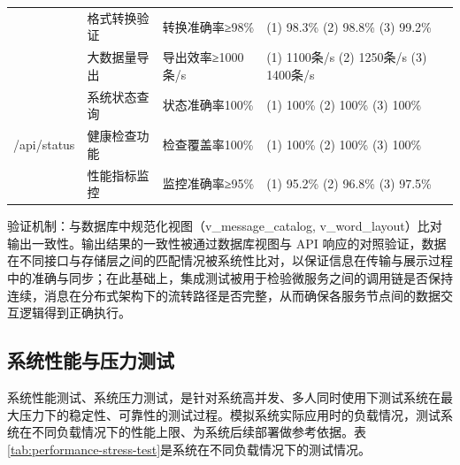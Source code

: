 \begin{table}[H]
{\begin{tabular}{l|l|l|l}
\cline{2-4}
& 格式转换验证 & 转换准确率≥98\% & (1) 98.3\% (2) 98.8\% (3) 99.2\% \\
\cline{2-4}
& 大数据量导出 & 导出效率≥1000条/s & (1) 1100条/s (2) 1250条/s (3) 1400条/s \\
\hline
\multirow{3}{*}{/api/status} & 系统状态查询 & 状态准确率100\% & (1) 100\% (2) 100\% (3) 100\% \\
\cline{2-4}
& 健康检查功能 & 检查覆盖率100\% & (1) 100\% (2) 100\% (3) 100\% \\
\cline{2-4}
& 性能指标监控 & 监控准确率≥95\% & (1) 95.2\% (2) 96.8\% (3) 97.5\% \\
\hline
\end{tabular}%
}
\end{table}

验证机制：与数据库中规范化视图（v\_message\_catalog, v\_word\_layout）比对输出一致性。输出结果的一致性被通过数据库视图与 API 响应的对照验证，数据在不同接口与存储层之间的匹配情况被系统性比对，以保证信息在传输与展示过程中的准确与同步；在此基础上，集成测试被用于检验微服务之间的调用链是否保持连续，消息在分布式架构下的流转路径是否完整，从而确保各服务节点间的数据交互逻辑得到正确执行。

\subsection{系统性能与压力测试}

系统性能测试、系统压力测试，是针对系统高并发、多人同时使用下测试系统在最大压力下的稳定性、可靠性的测试过程。模拟系统实际应用时的负载情况，测试系统在不同负载情况下的性能上限、为系统后续部署做参考依据。表\ref{tab:performance-stress-test}是系统在不同负载情况下的测试情况。

